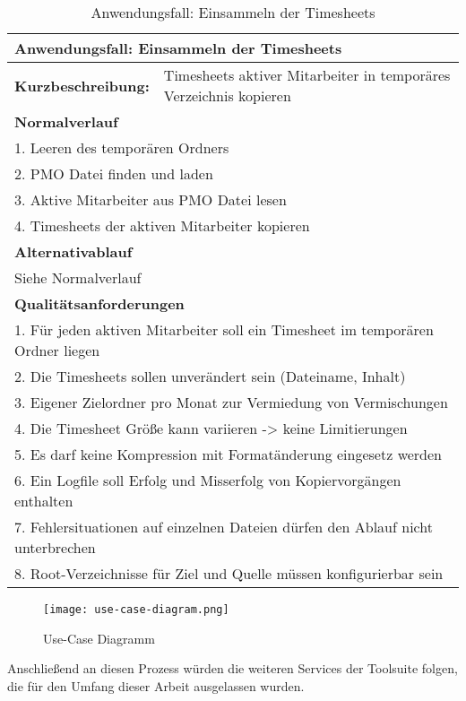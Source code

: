 \begin{table}[H]
    \begin{tabular}[H]{|l|l|}
        \hline
        \multicolumn{2}{|l|}{\textbf{Anwendungsfall:} Einsammeln der Timesheets} \\
        \hline
        \textbf{Kurzbeschreibung:} & Timesheets aktiver Mitarbeiter in temporäres Verzeichnis kopieren \\
        \hline
        \multicolumn{2}{|l|}{\textbf{Normalverlauf}} \\
        \hline
        \multicolumn{2}{|l|}{1. Leeren des temporären Ordners} \\
        \multicolumn{2}{|l|}{2. PMO Datei finden und laden} \\
        \multicolumn{2}{|l|}{3. Aktive Mitarbeiter aus PMO Datei lesen} \\
        \multicolumn{2}{|l|}{4. Timesheets der aktiven Mitarbeiter kopieren} \\
        \hline
        \multicolumn{2}{|l|}{\textbf{Alternativablauf}} \\
        \hline
        \multicolumn{2}{|l|}{Siehe Normalverlauf} \\
        \multicolumn{2}{|l|}{\textbf{Qualitätsanforderungen}} \\
        \hline
        \multicolumn{2}{|l|}{1. Für jeden aktiven Mitarbeiter soll ein Timesheet im temporären Ordner liegen} \\
        \multicolumn{2}{|l|}{2. Die Timesheets sollen unverändert sein (Dateiname, Inhalt)} \\
        \multicolumn{2}{|l|}{3. Eigener Zielordner pro Monat zur Vermiedung von Vermischungen} \\
        \multicolumn{2}{|l|}{4. Die Timesheet Größe kann variieren -> keine Limitierungen} \\
        \multicolumn{2}{|l|}{5. Es darf keine Kompression mit Formatänderung eingesetz werden} \\
        \multicolumn{2}{|l|}{6. Ein Logfile soll Erfolg und Misserfolg von Kopiervorgängen enthalten} \\
        \multicolumn{2}{|l|}{7. Fehlersituationen auf einzelnen Dateien dürfen den Ablauf nicht unterbrechen} \\
        \multicolumn{2}{|l|}{8. Root-Verzeichnisse für Ziel und Quelle müssen konfigurierbar sein} \\
        \hline
    \end{tabular}
    \caption{Anwendungsfall: Einsammeln der Timesheets}
    \label{tab:use-case-analyse-timesheets}
\end{table}

\begin{figure}[H]
    \centering
    \texttt{[image: use-case-diagram.png]}
    \caption{Use-Case Diagramm}
    \label{fig:use-case-diagram}
\end{figure}

Anschließend an diesen Prozess würden die weiteren Services der Toolsuite folgen, die für den Umfang dieser Arbeit ausgelassen wurden.
